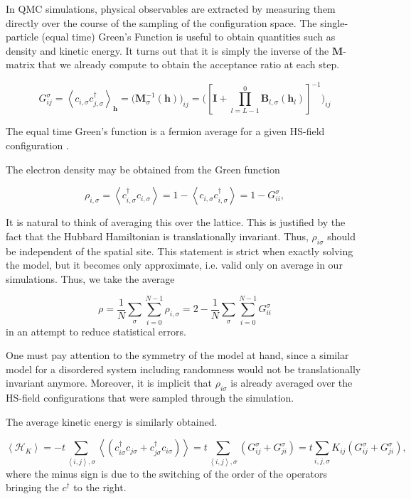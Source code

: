 In QMC simulations, physical observables are extracted by measuring them directly over the course of the sampling of the  configuration space. The single-particle (equal time) Green's Function is useful to obtain quantities such as density and kinetic energy. It turns out that it is simply the inverse of the $\bm M$-matrix that we already compute to obtain the acceptance ratio at each step.

\begin{equation}
G_{ij}^\sigma = \left\langle c_{i,\sigma} c_{j,\sigma}^\dagger \right\rangle_{\bm h} = \bigg( \bm M_\sigma^{-1} (\bm h) \bigg)_{ij} = \bigg( [\bm I + \prod_{l= L -1}^0 \bm B_{l,\sigma} ( \bm h_l ) ]^{-1} \bigg)_{ij}
\end{equation}

The equal time Green's function is a fermion average for a given HS-field configuration \cite{santos_introduction_2003}.

The electron density may be obtained from the Green function

\begin{equation}
\rho_{i, \sigma} = \left\langle c_{i,\sigma}^\dagger c_{i,\sigma} \right\rangle = 1 - \left\langle c_{i,\sigma} c_{i,\sigma}^\dagger \right\rangle = 1 - G_{ii}^\sigma ,
\end{equation}

It is natural to think of averaging this over the lattice.
This is justified by the fact that the Hubbard Hamiltonian is translationally invariant.
Thus, $\rho_{i\sigma}$ should be independent of the spatial site.
This statement is strict when exactly solving the model, but it becomes only approximate, i.e. valid only on average in our simulations.
Thus, we take the average

\begin{equation}
\rho = \frac{1}{N} \sum_\sigma \sum_{i=0}^{N-1} \rho_{i, \sigma} = 2 - \frac{1}{N} \sum_\sigma \sum_{i=0}^{N-1} G_{ii}^\sigma
\end{equation}
in an attempt to reduce statistical errors.

One must pay attention to the symmetry of the model at hand, since a similar model for a disordered system including randomness would not be translationally invariant anymore.
Moreover, it is implicit that $\rho_{i\sigma}$ is already averaged over the HS-field configurations that were sampled through the simulation.

The average kinetic energy is similarly obtained.

\begin{equation}
\left\langle \mathcal{H}_K \right\rangle = - t  \sum_{\left\langle i, j \right\rangle , \sigma} \left\langle ( c_{i\sigma}^\dagger c_{j\sigma} + c_{j\sigma}^\dagger c_{i\sigma} ) \right\rangle = t \sum_{\left\langle i, j \right\rangle , \sigma} ( G_{ij}^\sigma + G_{ji}^\sigma ) = t \sum_{ i, j , \sigma} K_{ij} ( G_{ij}^\sigma + G_{ji}^\sigma )  ,
\end{equation}
where the minus sign is due to the switching of the order of the operators bringing the $c^\dagger$ to the right.

